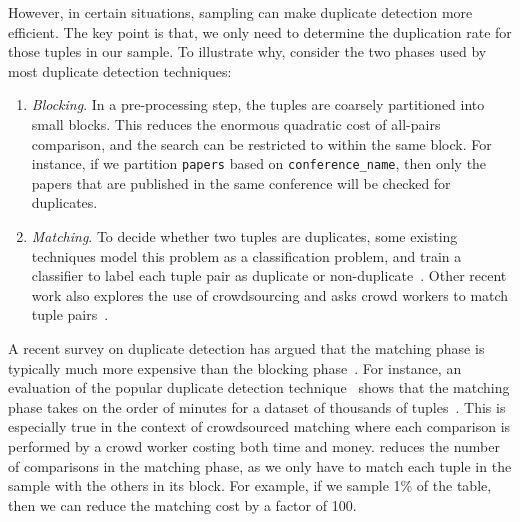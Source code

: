 However, in certain situations, sampling can make duplicate detection more efficient.
The key point is that, we only need to determine the duplication rate for those tuples in our sample. 
To illustrate why, consider the two phases used by most duplicate detection techniques:
\begin{enumerate}\vspace{-.25em}
\item \emph{Blocking}. 
In a pre-processing step, the tuples are coarsely partitioned into small blocks.
This reduces the enormous quadratic cost of all-pairs comparison, and the search can be restricted to within the same block. 
For instance, if we partition \texttt{papers} based on \texttt{conference\_name}, then only the papers that are published in the same conference will be checked for duplicates. 
\item \emph{Matching}. 
To decide whether two tuples are duplicates, some existing techniques model this problem as a classification problem, and train a classifier to label each tuple pair as duplicate or non-duplicate~\cite{DBLP:conf/kdd/BilenkoM03}. 
Other recent work also explores the use of crowdsourcing and asks crowd workers to match tuple pairs~\cite{DBLP:journals/pvldb/WangKFF12,DBLP:conf/www/DemartiniDC12}.
\end{enumerate}\vspace{-.25em}

A recent survey on duplicate detection has argued that the matching phase is typically much more expensive than the blocking phase~\cite{journals/tkde/Christen11}. 
For instance, an evaluation of the popular duplicate detection technique~\cite{DBLP:conf/kdd/BilenkoM03} shows that the matching phase takes on the order of minutes for a dataset of thousands of tuples~\cite{journals/pvldb/KopckeTR10}.
This is especially true in the context of crowdsourced matching where each comparison is performed by a crowd worker costing both time and money.
\saqpplus reduces the number of comparisons in the matching phase, as we only have to match each tuple in the sample with the others in its block.
For example, if we sample 1\% of the table, then we can reduce the matching cost by a factor of 100.



